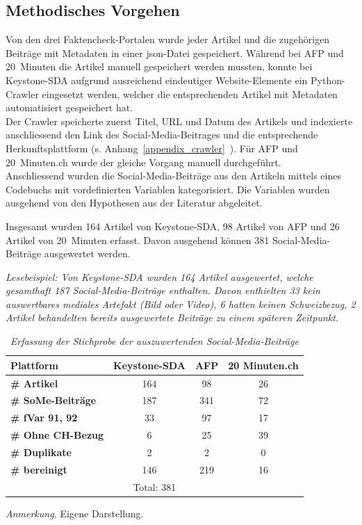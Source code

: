 \documentclass[12pt,a4paper]{article}        %
\begin{document}
\subsection{Methodisches Vorgehen}
Von den drei Faktencheck-Portalen wurde jeder Artikel und die zugehörigen Beiträge mit Metadaten in einer json-Datei gespeichert. Während bei AFP und 20 Minuten die Artikel manuell gespeichert werden mussten, konnte bei Keystone-SDA aufgrund ausreichend eindeutiger Website-Elemente ein Python-Crawler eingesetzt werden, welcher die entsprechenden Artikel mit Metadaten automatisiert gespeichert hat.\\
Der Crawler speicherte zuerst Titel, URL und Datum des Artikels und indexierte anschliessend den Link des Social-Media-Beitrages und die entsprechende Herkunftsplattform (s. Anhang~\ref{appendix_crawler}~). Für AFP und 20 Minuten.ch wurde der gleiche Vorgang manuell durchgeführt.\\
Anschliessend wurden die Social-Media-Beiträge aus den Artikeln mittels eines Codebuchs mit vordefinierten Variablen kategorisiert. Die Variablen wurden ausgehend von den Hypothesen aus der Literatur abgeleitet.

Insgesamt wurden 164 Artikel von Keystone-SDA, 98 Artikel von AFP und 26 Artikel von 20 Minuten erfasst. Davon ausgehend können 381 Social-Media-Beiträge ausgewertet werden.

\begin{table}[H]
  \caption{\textit{Erfassung der Stichprobe der auszuwertenden Social-Media-Beiträge}}

  \textit{Lesebeispiel: Von Keystone-SDA wurden 164 Artikel ausgewertet, welche gesamthaft 187 Social-Media-Beiträge enthalten. Davon enthielten 33 kein auswertbares mediales Artefakt (Bild oder Video), 6 hatten keinen Schweizbezug, 2 Artikel behandelten bereits ausgewertete Beiträge zu einem späteren Zeitpunkt.}
  \label{tab:method_sample}
  \centering
  \begin{tabular}{|l|c|c|c|}
    \hline
    \textbf{Plattform} & \textbf{Keystone-SDA} & \textbf{AFP} & \textbf{20 Minuten.ch} \\
    \hline
    \textbf{\# Artikel} & 164 & 98 & 26 \\
    \hline
    \textbf{\# SoMe-Beiträge} & 187 & 341 & 72 \\
    \hline
    \textbf{\# fVar 91, 92} & 33 & 97 & 17 \\
    \hline
    \textbf{\# Ohne CH-Bezug} & 6 & 25 & 39 \\
    \hline
    \textbf{\# Duplikate} & 2 & 2 & 0 \\
    \hline
    \textbf{\# bereinigt} & 146 & 219 & 16 \\
    \hline
    \multicolumn{4}{|c|}{Total: 381} \\
    \hline
  \end{tabular}

  \footnotesize\textit{Anmerkung.} Eigene Darstellung.
\end{table}
\end{document}
